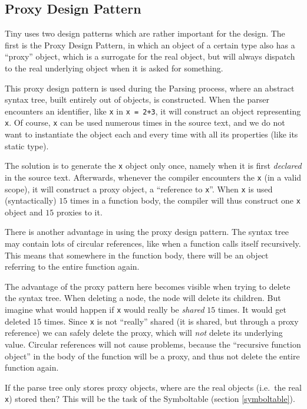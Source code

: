 \documentclass[a4paper]{article}
\begin{document}
\subsection{Proxy Design Pattern}

Tiny uses two design patterns which are rather important for the design. The
first is the Proxy Design Pattern, in which an object of a certain type also
has a ``proxy'' object, which is a surrogate for the real object, but will
always dispatch to the real underlying object when it is asked for something.

This proxy design pattern is used during the Parsing process, where an
abstract syntax tree, built entirely out of objects, is constructed.
When the parser encounters an identifier, like \texttt{x} in \texttt{x = 2+3},
it will construct an object representing \texttt{x}. Of course, \texttt{x} can
be used numerous times in the source text, and we do not want to instantiate
the object each and every time with all its properties (like its static type).

The solution is to generate the \texttt{x} object only once, namely when it is
first \textsl{declared} in the source text. Afterwards, whenever the compiler
encounters the \texttt{x} (in a valid scope), it will construct a proxy
object, a ``reference to \texttt{x}''. When \texttt{x} is used (syntactically)
$15$ times in a function body, the compiler will thus construct one \texttt{x}
object and $15$ proxies to it.

There is another advantage in using the proxy design pattern.
The syntax tree may contain lots of circular references, like when a function
calls itself recursively. This means that somewhere in the function body,
there will be an object referring to the entire function again.

The advantage of the proxy pattern here becomes visible when trying to delete the
syntax tree. When deleting a node, the node will delete its children. But imagine
what would happen if \texttt{x} would really be \emph{shared} $15$ times. It
would get deleted $15$ times. Since \texttt{x} is not ``really'' shared (it
is shared, but through a proxy reference) we can safely delete the proxy,
which will \emph{not} delete its underlying value. Circular references will
not cause problems, because the ``recursive function object'' in the body of
the function will be a proxy, and thus not delete the entire function again.

If the parse tree only stores proxy objects, where are the real objects
(i.e.~the real \texttt{x}) stored then? This will be the task of the Symboltable
(section \ref{symboltable}).
\end{document}
